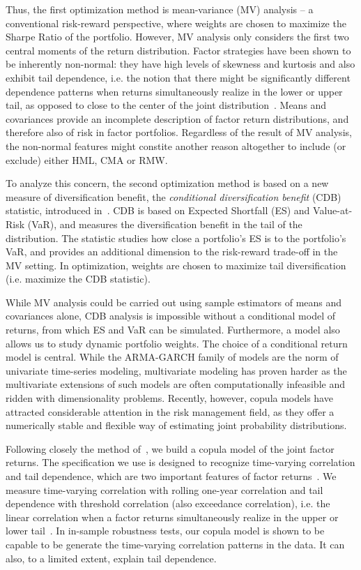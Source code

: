 Thus, the first optimization method is mean-variance (MV) analysis -- a conventional risk-reward perspective, where weights are chosen to maximize the Sharpe Ratio of the portfolio. However, MV analysis only considers the first two central moments of the return distribution. Factor strategies have been shown to be inherently non-normal: they have high levels of skewness and kurtosis and also exhibit tail dependence, i.e. the notion that there might be significantly different dependence patterns when returns simultaneously realize in the lower or upper tail, as opposed to close to the center of the joint distribution~\autocite{ChristoffersenLanglois2013}. Means and covariances provide an incomplete description of factor return distributions, and therefore also of risk in factor portfolios. Regardless of the result of MV analysis, the non-normal features might constite another reason altogether to include (or exclude) either HML, CMA or RMW.

To analyze this concern, the second optimization method is based on a new measure of diversification benefit, the \emph{conditional diversification benefit} (CDB) statistic, introduced in~\textcite{ChristoffersenErrunzaJacobLanglois2012}. CDB is based on Expected Shortfall (ES) and Value-at-Risk (VaR), and measures the diversification benefit in the tail of the distribution. The statistic studies how close a portfolio's ES is to the portfolio's VaR, and provides an additional dimension to the risk-reward trade-off in the MV setting. In optimization, weights are chosen to maximize tail diversification (i.e. maximize the CDB statistic).

While MV analysis could be carried out using sample estimators of means and covariances alone, CDB analysis is impossible without a conditional model of returns, from which ES and VaR can be simulated. Furthermore, a model also allows us to study dynamic portfolio weights. The choice of a conditional return model is central. While the ARMA-GARCH family of models are the norm of univariate time-series modeling, multivariate modeling has proven harder as the multivariate extensions of such models are often computationally infeasible and ridden with dimensionality problems. Recently, however, copula models have attracted considerable attention in the risk management field, as they offer a numerically stable and flexible way of estimating joint probability distributions. 

Following closely the method of~\textcite{ChristoffersenLanglois2013}, we build a copula model of the joint factor returns. The specification we use is designed to recognize time-varying correlation and tail dependence, which are two important features of factor returns~\autocite{ChristoffersenLanglois2013}. We measure time-varying correlation with rolling one-year correlation and tail dependence with threshold correlation (also exceedance correlation), i.e. the linear correlation when a factor returns simultaneously realize in the upper or lower tail~\autocite{AngChen2002}. In in-sample robustness tests, our copula model is shown to be capable to be generate the time-varying correlation patterns in the data. It can also, to a limited extent, explain tail dependence.

